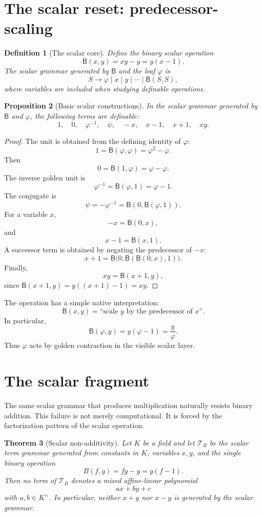 \documentclass[11pt]{article}
\newtheorem{definition}{Definition}[section]
\newtheorem{theorem}[definition]{Theorem}
\newtheorem{proposition}[definition]{Proposition}
\newcommand{\B}{\mathsf{B}}
\newcommand{\ph}{\varphi}
\newcommand{\ps}{\psi}
\begin{document}
\section{The scalar reset: predecessor-scaling}

\begin{definition}[The scalar core]
Define the binary scalar operation
\[
    \B(x,y)=xy-y=y(x-1).
\]
The scalar grammar generated by $\B$ and the leaf $\ph$ is
\[
    S\to \ph \mid x \mid y \mid \cdots \mid \B(S,S),
\]
where variables are included when studying definable operations.
\end{definition}

\begin{proposition}[Basic scalar constructions]\label{prop:scalar-constructions}
In the scalar grammar generated by $\B$ and $\ph$, the following terms are definable:
\[
    1,\quad 0,\quad \ph^{-1},\quad \ps,\quad -x,\quad x-1,\quad x+1,\quad xy.
\]
\end{proposition}

\begin{proof}
The unit is obtained from the defining identity of $\ph$:
\[
    1=\B(\ph,\ph)=\ph^2-\ph.
\]
Then
\[
    0=\B(1,\ph)=\ph-\ph.
\]
The inverse golden unit is
\[
    \ph^{-1}=\B(\ph,1)=\ph-1.
\]
The conjugate is
\[
    \ps=-\ph^{-1}=\B(0,\B(\ph,1)).
\]
For a variable $x$,
\[
    -x=\B(0,x),
\]
and
\[
    x-1=\B(x,1).
\]
A successor term is obtained by negating the predecessor of $-x$:
\[
    x+1=\B\bigl(0,\B(\B(0,x),1)\bigr).
\]
Finally,
\[
    xy=\B(x+1,y),
\]
since $\B(x+1,y)=y((x+1)-1)=xy$.
\end{proof}

The operation has a simple native interpretation:
\[
    \B(x,y)=\text{``scale }y\text{ by the predecessor of }x\text{''}.
\]
In particular,
\[
    \B(\ph,y)=y(\ph-1)=\frac{y}{\ph}.
\]
Thus $\ph$ acts by golden contraction in the visible scalar layer.

\section{The scalar fragment}

The same scalar grammar that produces multiplication naturally resists binary addition.  This failure is not merely computational.  It is forced by the factorization pattern of the scalar operation.

\begin{theorem}[Scalar non-additivity]\label{thm:scalar-nonadditivity}
Let $K$ be a field and let $\mathcal T_B$ be the scalar term grammar generated from constants in $K$, variables $x,y$, and the single binary operation
\[
    B(f,g)=fg-g=g(f-1).
\]
Then no term of $\mathcal T_B$ denotes a mixed affine-linear polynomial
\[
    ax+by+c
\]
with $a,b\in K^\times$.  In particular, neither $x+y$ nor $x-y$ is generated by the scalar grammar.
\end{theorem}
\end{document}
